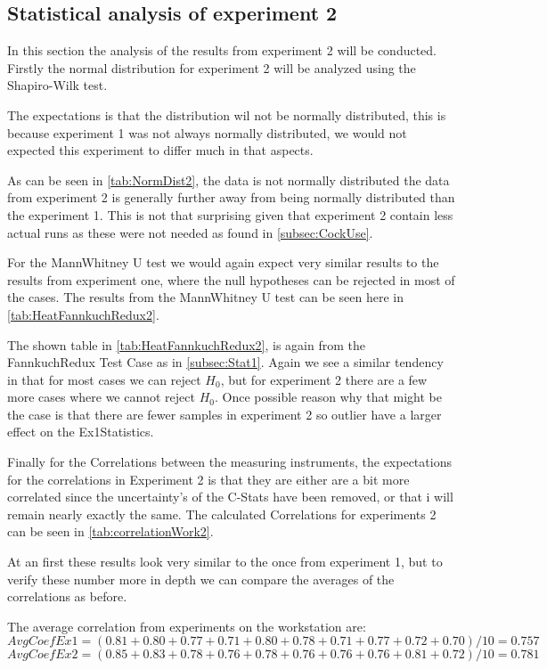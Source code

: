 \subsection{Statistical analysis of experiment 2}
In this section the analysis of the results from experiment 2 will be conducted. Firstly the normal distribution for experiment 2 will be analyzed using the Shapiro-Wilk test. 

The expectations is that the distribution wil not be normally distributed, this is because experiment 1 was not always normally distributed, we would not expected this experiment to differ much in that aspects. 

 

As can be seen in \cref{tab:NormDist2}, the data is not normally distributed the data from experiment 2 is generally further away from being normally distributed than the experiment 1. This is not that surprising given that experiment 2 contain less actual runs as these were not needed as found in \cref{subsec:CockUse}. 

For the MannWhitney U test we would again expect very similar results to the results from experiment one, where the null hypotheses can be rejected in most of the cases.
The results from the MannWhitney U test can be seen here in \cref{tab:HeatFannkuchRedux2}.

The shown table in \cref{tab:HeatFannkuchRedux2}, is again from the FannkuchRedux Test Case as in \cref{subsec:Stat1}. Again we see a similar tendency in that for most cases we can reject $H_0$, but for experiment 2 there are a few more cases where we cannot reject $H_0$. Once possible reason why that might be the case is that there are fewer samples in experiment 2 so outlier have a larger effect on the Ex1Statistics.

Finally for the Correlations between the measuring instruments, the expectations for the correlations in Experiment 2 is that they are either are a bit more correlated since the uncertainty's of the C-Stats have been removed, or that i will remain nearly exactly the same. The calculated Correlations for experiments 2 can be seen in \cref{tab:correlationWork2}.

At an first these results look very similar to the once from experiment 1, but to verify these number more in depth we can compare the averages of the correlations as before.

The average correlation from experiments on the workstation are:
$$AvgCoefEx1 = (0.81+0.80+0.77+0.71+0.80+0.78+0.71+0.77+0.72+0.70)/10 = 0.757$$
$$AvgCoefEx2 = (0.85+0.83+0.78+0.76+0.78+0.76+0.76+0.76+0.81+0.72)/10 = 0.781$$


